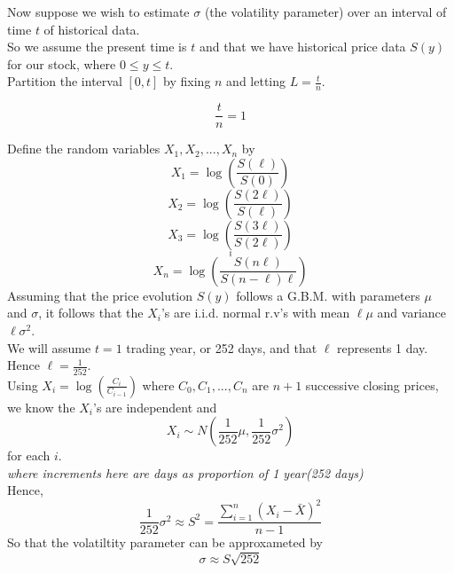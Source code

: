 \documentclass[10 pt, a4paper]{article}
\begin{document}
Now suppose we wish to estimate $\sigma$ (the volatility parameter) over an interval of time $t$ of historical data. \\

So we assume the present time is $t$ and that we have historical price data $S(y)$ for our stock, where $0\leq y\leq t$. \\

Partition the interval $[0,t]$ by fixing $n$ and letting $L=\frac tn$. \\
\begin{center}
$$\frac tn=1$$
\end{center}
Define the random variables $X_1,X_2,...,X_n$ by\\
$$X_1=\log(\frac{S(\ell)}{S(0)})$$
$$X_2=\log(\frac{S(2\ell)}{S(\ell)})$$
$$X_3=\log(\frac{S(3\ell)}{S(2\ell)})$$
$$.$$
$$.$$
$$.$$
$$X_n=\log(\frac{S(n\ell)}{S(n-\ell)\ell})$$
Assuming that the price evolution $S(y)$ follows a G.B.M. with parameters $\mu$ and $\sigma$, it follows that the $X_i$'s are i.i.d. normal r.v's with mean $\ell \mu$ and variance $\ell\sigma^2$.\\

We will assume $t=1$ trading year, or 252 days, and that $\ell$ represents 1 day. Hence $\ell=\frac {1}{252}$. \\

Using $X_i=\log(\frac{C_i}{C_{i-1}})$ where $C_0,C_1,...,C_n$ are $n+1$ successive closing prices, we know the $X_i$'s are independent and
$$X_i\sim N(\frac{1}{252}\mu, \frac{1}{252}\sigma^2)$$ for each $i$.\\ \textit{where increments here are days as proportion of 1 year(252 days)}\\

Hence, $$\frac{1}{252}\sigma^2\approx S^2=\frac{\sum_{i=1}^n(X_i-\bar{X})^2}{n-1}$$
So that the volatiltity parameter can be approxameted by $$\sigma\approx S\sqrt{252}$$
\end{document}

